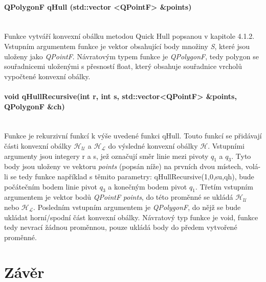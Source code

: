 \documentclass[11pt]{article}
\begin{document}
		\paragraph{QPolygonF qHull (std::vector <QPointF> \&points)}\mbox{}\\
		Funkce vytváří konvexní obálku metodou Quick Hull popsanou v kapitole 4.1.2. Vstupním argumentem funkce je vektor obsahující body množiny \textit{S}, které jsou uloženy jako \textit{QPointF}. Návratovým typem funkce je \textit{QPolygonF}, tedy polygon se souřadnicemi uloženými s přesností float, který obsahuje souřadnice vrcholů vypočtené konvexní obálky. 

		\paragraph{void qHullRecursive(int r, int s, std::vector<QPointF> \&points, QPolygonF \&ch)}\mbox{}\\
		Funkce je rekurzivní funkcí k výše uvedené funkci qHull. Touto funkcí se přidávají části konvexní obálky $\mathcal{H_U}$ a $\mathcal{H_L}$ do výsledné konvexní obálky $\mathcal{H}$.
	 	Vstupními argumenty jsou integery r a s, jež označují směr linie mezi pivoty \textit{$ q_1 $} a \textit{$ q_3 $}. Tyto body jsou uloženy ve vektoru \textit{points} (popsán níže) na prvních dvou místech, volá-li se tedy funkce například s těmito parametry: qHullRecursive(1,0,su,qh), bude počátečním bodem linie pivot \textit{$ q_3 $} a konečným bodem pivot \textit{$ q_1 $}. Třetím vstupním argumentem je vektor bodů \textit{QPointF} \textit{points}, do této proměnné se ukládá  $\mathcal{H_U}$ nebo $\mathcal{H_L}$. Posledním vstupním argumentem je \textit{QPolygonF}, do nějž se bude ukládat horní/spodní část konvexní obálky. Návratový typ funkce je void, funkce tedy nevrací žádnou proměnnou, pouze ukládá body do předem vytvořené proměnné.
		
		
		\section{Závěr}
		
		
		

		
	
\end{document}
